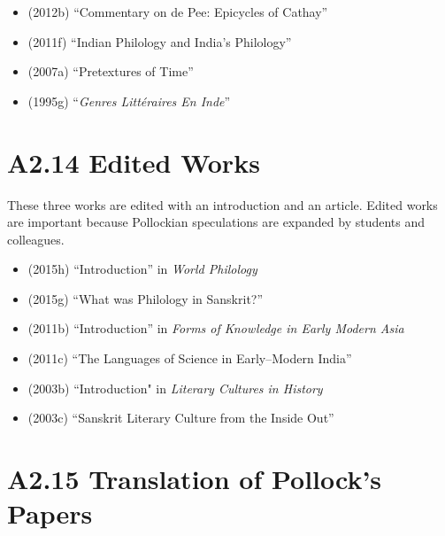 \begin{itemize}
\item (2012b) “Commentary on de Pee: Epicycles of Cathay”

 \item (2011f) “Indian Philology and India’s Philology”

 \item (2007a) “Pretextures of Time”

 \item (1995g) “\textit{Genres Littéraires En Inde}” 

\end{itemize}


\section*{A2.14 Edited Works}

These three works are edited with an introduction and an article. Edited works are important because Pollockian speculations are expanded by students and colleagues.

\begin{itemize}
\item (2015h) “Introduction” in \textit{World Philology}

 \item (2015g) “What was Philology in Sanskrit?”

 \item (2011b) “Introduction” in \textit{Forms of Knowledge in Early Modern Asia}

 \item (2011c) “The Languages of Science in Early–Modern India”

 \item (2003b) “Introduction" in \textit{Literary Cultures in History}

 \item (2003c) “Sanskrit Literary Culture from the Inside Out”

\end{itemize}


\section*{A2.15 Translation of Pollock’s Papers}

